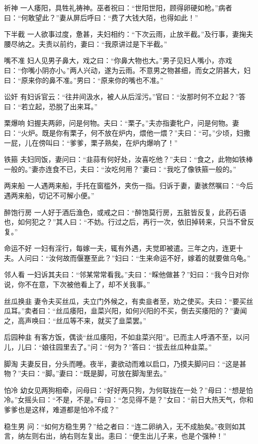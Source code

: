 \documentclass[12pt,UTF8]{ctexbook}
\begin{document}
祈神
一人痿阳，具牲礼祷神。巫者祝曰：“世阳世阳，顾得卵硬如枪。”病者曰：“何敢望此？”妻从屏后呼曰：“费了大钱大陌，也得如此！”

下半截
一人欲事过度，惫甚，夫妇相约：“下次云雨，止放半截。”及行事，妻掬夫腰尽纳之。夫责以前约，妻曰：“我原讲过是下半截。”

嘴不准
妇人见男子鼻大，戏之曰：“你鼻大物也大。”男子见妇人嘴小，亦戏曰：“你嘴小阴亦小。”两人兴动，遂为云雨。不意男之物甚细，而女之阴甚大，妇曰：“原来你的鼻不准。”男曰：“原来你的嘴也不准。”

讼奸
有妇诉官云：“往井间汲水，被人从后淫污。”官曰：“汝那时何不立起？”答曰：“若立起，恐脱了出来耳。”

栗爆响
妇握夫两卵，问是何物。夫曰：“栗子。”夫亦指妻牝户，问是何物。妻曰：“火炉。既是你有栗子，何不放在炉内，煨他一煨？”夫曰：“可。”少顷，妇撒一屁，儿在傍叫曰：“爹爹，栗子熟矣，在炉内爆响了！”

铁箍
夫妇同饭，妻问曰：“韭蒜有何好处，汝喜吃他？”夫曰：“食之，此物如铁棒一般的。”妻亦连食不已，夫曰：“汝吃何用？”妻曰：“我吃了像铁箍一般的。”

两来船
一人遇两来船，手托在窗槛外，夹伤一指。归诉于妻，妻骇然嘱曰：“今后遇两来船，切记不可解小便。”

醉饱行房
一人好于酒后渔色，或戒之曰：“醉饱莫行房，五脏皆反复，此药石语也，如何犯之？”其人曰：“不妨。行过之后，再行一次，依旧掉转来，只当不曾反复。”

命运不好
一妇有淫行，每嫁一夫，辄有外遇，夫觉即被遣。三年之内，连更十夫。人问曰：“汝何故而偃蹇至此？”妇曰：“生来命运不好，嫁着的就要做乌龟。”

邻人看
一妇诉其夫曰：“邻某常常看我。”夫曰：“睬他做甚？”妇曰：“我今日对你说，你不在意，下次被他看上了，却不关我事。”

丝瓜换韭
妻令夫买丝瓜，夫立门外候之，有卖韭者至，劝之使买。夫曰：“要买丝瓜耳。”卖者曰：“丝瓜痿阳，韭菜兴阳，如何兴阳的不买，倒去买痿阳的？”妻闻之，高声唤曰：“丝瓜等不来，就买了韭菜罢。”

后园种韭
有客方饭，偶谈“丝瓜痿阳，不如韭菜兴阳”。已而主人呼酒不至，以问儿，儿曰：“娘往园里去了。”问：“何为？”答曰：“拔去丝瓜种韭菜。”

脚淘
夫妻反目，分头而睡。夜半，妻欲动而难以启口，乃摸夫脚问曰：“这是甚物？”夫曰：“脚。”妻曰：“既是脚，可放在脚淘里去。”

怕冷
幼女见两狗相牵，问母曰：“好好两只狗，为何联拢在一处？”母曰：“想是怕冷。”女摇头曰：“不是，不是。”母曰：“怎见得不是？”女曰：“前日大热天气，你和爹爹也是这样，难道都是怕冷不成？”

稳生男
问：“如何方稳生男？”给之者曰：“连二卵纳入，无不成胎矣。”夜则如其言，纳左则右出，纳右则左复出。恚曰：“便生出儿子来，也是个强种！”
\end{document}
